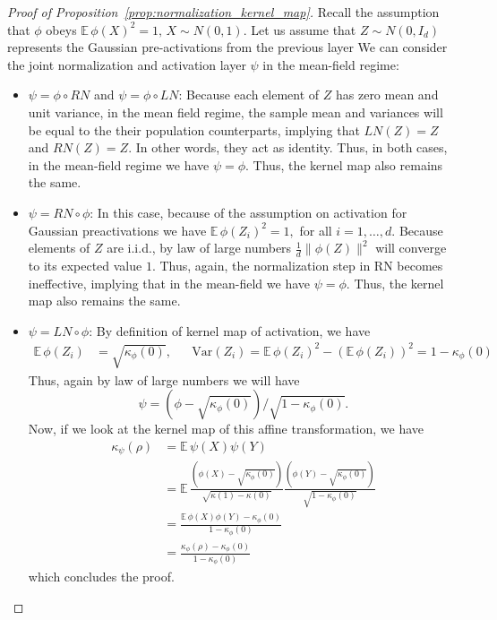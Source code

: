 \documentclass[twoside]{article}
\newcommand{\E}{\mathbb{E}\,}
\theoremstyle{definition}
\begin{document}
\begin{proof}[Proof of Proposition~\ref{prop:normalization_kernel_map}]
Recall the assumption that $\phi$ obeys $\E \phi(X)^2 = 1,\, X\sim N(0,1). $ Let us assume that $Z\sim N(0,I_d)$ represents the Gaussian pre-activations from the previous layer We can consider the joint normalization and activation layer $\psi$ in the mean-field regime: 
\begin{itemize}
    \item $\psi = \phi\circ RN$ and $\psi = \phi\circ LN$: Because each element of $Z$ has zero mean and unit variance, in the mean field regime, the sample mean and variances will be equal to the their population counterparts, implying that $LN(Z) = Z$ and $RN(Z) = Z.$ In other words, they act as identity. Thus, in both cases, in the mean-field regime we have $\psi = \phi.$ Thus, the kernel map also remains the same. 
    \item $\psi = RN \circ \phi$: In this case, because of the assumption on activation for Gaussian preactivations we have $\E \phi(Z_i)^2 = 1,$ for all $i=1,\dots, d.$ Because elements of $Z$ are i.i.d., by law of large numbers $\frac1d\|\phi(Z)\|^2$ will converge to its expected value $1.$ Thus, again, the normalization step in RN becomes ineffective, implying that in the mean-field we have $\psi = \phi.$ Thus, the kernel map also remains the same. 
    \item $\psi = LN \circ \phi$: By definition of kernel map of activation, we have  
     \begin{align*}
         \E \phi(Z_i) &= \sqrt{\kappa_\phi(0)}, 
        && \mathrm{Var}(Z_i) = \E \phi(Z_i)^2 - (\E \phi(Z_i))^2 =  1- \kappa_\phi(0)
     \end{align*}
    Thus, again by law of large numbers we will have 
    $$\psi = (\phi - \sqrt{\kappa_\phi(0)})/\sqrt{1 - \kappa_\phi(0)}.$$ Now, if we look at the kernel map of this affine transformation, we have 
     \begin{align*}
     \kappa_\psi(\rho) &= \E \psi(X)\psi(Y)\\
     &= \E \frac{(\phi(X)-\sqrt{\kappa_\phi(0)} )}{\sqrt{\kappa(1)-\kappa(0)}}\frac{(\phi(Y)-\sqrt{\kappa_\phi(0)} )}{\sqrt{1-\kappa_\phi(0)}}\\
     &= \frac{\E \phi(X)\phi(Y) - \kappa_\phi(0)}{1-\kappa_\phi(0)}\\
     &= \frac{\kappa_\phi(\rho)-\kappa_\phi(0)}{1-\kappa_\phi(0)}
     \end{align*}
    which concludes the proof. 
\end{itemize}

\end{proof}
\end{document}
